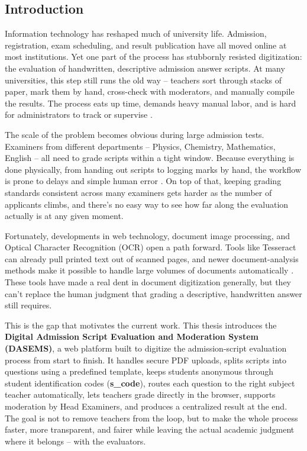 
\vspace{0.5cm}

\subsection{Introduction}

Information technology has reshaped much of university life. Admission, registration, exam scheduling, and result publication have all moved online at most institutions. Yet one part of the process has stubbornly resisted digitization: the evaluation of handwritten, descriptive admission answer scripts. At many universities, this step still runs the old way -- teachers sort through stacks of paper, mark them by hand, cross-check with moderators, and manually compile the results. The process eats up time, demands heavy manual labor, and is hard for administrators to track or supervise \cite{article,inproceedings}.

The scale of the problem becomes obvious during large admission tests. Examiners from different departments -- Physics, Chemistry, Mathematics, English -- all need to grade scripts within a tight window. Because everything is done physically, from handing out scripts to logging marks by hand, the workflow is prone to delays and simple human error \cite{8878791}. On top of that, keeping grading standards consistent across many examiners gets harder as the number of applicants climbs, and there's no easy way to see how far along the evaluation actually is at any given moment.

Fortunately, developments in web technology, document image processing, and Optical Character Recognition (OCR) open a path forward. Tools like Tesseract can already pull printed text out of scanned pages, and newer document-analysis methods make it possible to handle large volumes of documents automatically \cite{4376991,FRANCIS2025100532}. These tools have made a real dent in document digitization generally, but they can't replace the human judgment that grading a descriptive, handwritten answer still requires.

This is the gap that motivates the current work. This thesis introduces the \textbf{Digital Admission Script Evaluation and Moderation System (DASEMS)}, a web platform built to digitize the admission-script evaluation process from start to finish. It handles secure PDF uploads, splits scripts into questions using a predefined template, keeps students anonymous through student identification codes (\textbf{s\_code}), routes each question to the right subject teacher automatically, lets teachers grade directly in the browser, supports moderation by Head Examiners, and produces a centralized result at the end. The goal is not to remove teachers from the loop, but to make the whole process faster, more transparent, and fairer while leaving the actual academic judgment where it belongs -- with the evaluators.

